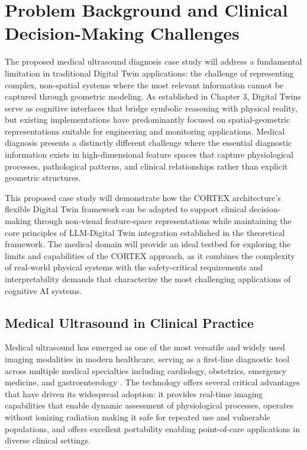 \section{Problem Background and Clinical Decision-Making Challenges}

The proposed medical ultrasound diagnosis case study will address a fundamental limitation in traditional Digital Twin applications: the challenge of representing complex, non-spatial systems where the most relevant information cannot be captured through geometric modeling. As established in Chapter 3, Digital Twins serve as cognitive interfaces that bridge symbolic reasoning with physical reality, but existing implementations have predominantly focused on spatial-geometric representations suitable for engineering and monitoring applications. Medical diagnosis presents a distinctly different challenge where the essential diagnostic information exists in high-dimensional feature spaces that capture physiological processes, pathological patterns, and clinical relationships rather than explicit geometric structures.

This proposed case study will demonstrate how the CORTEX architecture's flexible Digital Twin framework can be adapted to support clinical decision-making through non-visual feature-space representations while maintaining the core principles of LLM-Digital Twin integration established in the theoretical framework. The medical domain will provide an ideal testbed for exploring the limits and capabilities of the CORTEX approach, as it combines the complexity of real-world physical systems with the safety-critical requirements and interpretability demands that characterize the most challenging applications of cognitive AI systems.

\subsection{Medical Ultrasound in Clinical Practice}

Medical ultrasound has emerged as one of the most versatile and widely used imaging modalities in modern healthcare, serving as a first-line diagnostic tool across multiple medical specialties including cardiology, obstetrics, emergency medicine, and gastroenterology \cite{dietrich2017efsumb}. The technology offers several critical advantages that have driven its widespread adoption: it provides real-time imaging capabilities that enable dynamic assessment of physiological processes, operates without ionizing radiation making it safe for repeated use and vulnerable populations, and offers excellent portability enabling point-of-care applications in diverse clinical settings.

